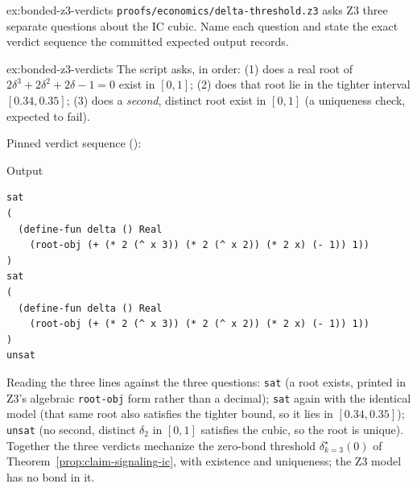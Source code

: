 \documentclass[11pt,a4paper]{article}
\theoremstyle{definition}
\theoremstyle{remark}
\begin{document}
\begin{pdexercise}[kind=Trace,rating=2]{ex:bonded-z3-verdicts}
\texttt{proofs/economics/delta-threshold.z3} asks Z3 three separate questions about the IC cubic. Name each question and state the exact verdict sequence the committed expected output records.
\end{pdexercise}
\begin{pdsolution}{ex:bonded-z3-verdicts}
The script asks, in order: (1) does a real root of $2\delta^3+2\delta^2+2\delta-1=0$ exist in $[0,1]$; (2) does that root lie in the tighter interval $[0.34, 0.35]$; (3) does a \emph{second}, distinct root exist in $[0,1]$ (a uniqueness check, expected to fail).

Pinned verdict sequence ():
\begin{pdlisting}{Output}{}
\begin{lstlisting}[style=pdoutput]
sat
(
  (define-fun delta () Real
    (root-obj (+ (* 2 (^ x 3)) (* 2 (^ x 2)) (* 2 x) (- 1)) 1))
)
sat
(
  (define-fun delta () Real
    (root-obj (+ (* 2 (^ x 3)) (* 2 (^ x 2)) (* 2 x) (- 1)) 1))
)
unsat
\end{lstlisting}
\end{pdlisting}
Reading the three lines against the three questions: \texttt{sat} (a root exists, printed in Z3's algebraic \texttt{root-obj} form rather than a decimal); \texttt{sat} again with the identical model (that same root also satisfies the tighter bound, so it lies in $[0.34,0.35]$); \texttt{unsat} (no second, distinct $\delta_2$ in $[0,1]$ satisfies the cubic, so the root is unique). Together the three verdicts mechanize the zero-bond threshold $\delta^\star_{k=3}(0)$ of Theorem~\ref{prop:claim-signaling-ic}, with existence and uniqueness; the Z3 model has no bond in it.
\end{pdsolution}
\end{document}

